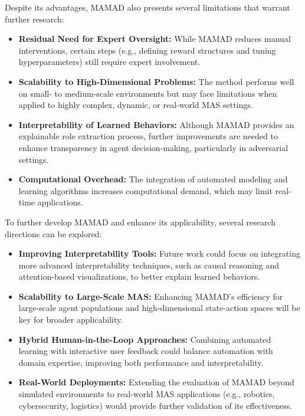 \documentclass[pdflatex,sn-mathphys-num]{sn-jnl}%
\theoremstyle{thmstyleone}%
\theoremstyle{thmstyletwo}%
\theoremstyle{thmstylethree}%
\begin{document}
Despite its advantages, MAMAD also presents several limitations that warrant further research:
%
\begin{itemize}
    \item \textbf{Residual Need for Expert Oversight:} While MAMAD reduces manual interventions, certain steps (e.g., defining reward structures and tuning hyperparameters) still require expert involvement.
    \item \textbf{Scalability to High-Dimensional Problems:} The method performs well on small- to medium-scale environments but may face limitations when applied to highly complex, dynamic, or real-world MAS settings.
    \item \textbf{Interpretability of Learned Behaviors:} Although MAMAD provides an explainable role extraction process, further improvements are needed to enhance transparency in agent decision-making, particularly in adversarial settings.
    \item \textbf{Computational Overhead:} The integration of automated modeling and learning algorithms increases computational demand, which may limit real-time applications.
\end{itemize}


To further develop MAMAD and enhance its applicability, several research directions can be explored:
%
\begin{itemize}
    \item \textbf{Improving Interpretability Tools:} Future work could focus on integrating more advanced interpretability techniques, such as causal reasoning and attention-based visualizations, to better explain learned behaviors.
    \item \textbf{Scalability to Large-Scale MAS:} Enhancing MAMAD's efficiency for large-scale agent populations and high-dimensional state-action spaces will be key for broader applicability.
    \item \textbf{Hybrid Human-in-the-Loop Approaches:} Combining automated learning with interactive user feedback could balance automation with domain expertise, improving both performance and interpretability.
    \item \textbf{Real-World Deployments:} Extending the evaluation of MAMAD beyond simulated environments to real-world MAS applications (e.g., robotics, cybersecurity, logistics) would provide further validation of its effectiveness.
\end{itemize}



\end{document}
